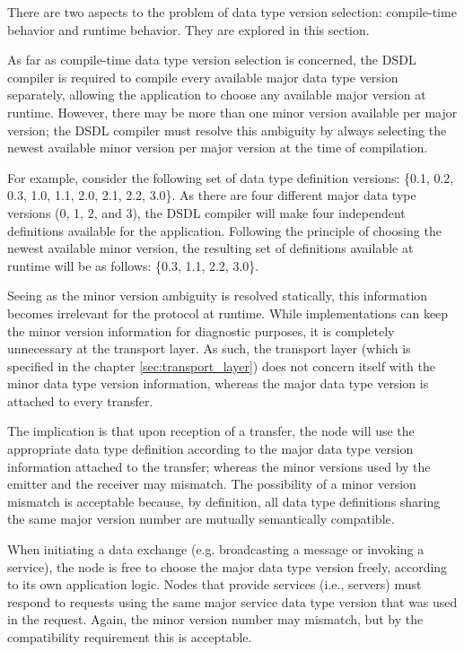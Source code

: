 There are two aspects to the problem of data type version selection:
compile-time behavior and runtime behavior.
They are explored in this section.

As far as compile-time data type version selection is concerned,
the DSDL compiler is required to compile every available major data type version separately,
allowing the application to choose any available major version at runtime.
However, there may be more than one minor version available per major version;
the DSDL compiler must resolve this ambiguity by always selecting the newest available minor
version per major version at the time of compilation.

For example, consider the following set of data type definition versions:
\{0.1, 0.2, 0.3, 1.0, 1.1, 2.0, 2.1, 2.2, 3.0\}.
As there are four different major data type versions (0, 1, 2, and 3),
the DSDL compiler will make four independent definitions available for the application.
Following the principle of choosing the newest available minor version,
the resulting set of definitions available at runtime will be as follows:
\{0.3, 1.1, 2.2, 3.0\}.

Seeing as the minor version ambiguity is resolved statically,
this information becomes irrelevant for the protocol at runtime.
While implementations can keep the minor version information for diagnostic purposes,
it is completely unnecessary at the transport layer.
As such, the transport layer (which is specified in the chapter \ref{sec:transport_layer})
does not concern itself with the minor data type version information,
whereas the major data type version is attached to every transfer.

The implication is that upon reception of a transfer, the node will use the appropriate
data type definition according to the major data type version information attached to the
transfer; whereas the minor versions used by the emitter and the receiver may mismatch.
The possibility of a minor version mismatch is acceptable because, by definition,
all data type definitions sharing the same major version number are mutually semantically compatible.

When initiating a data exchange (e.g. broadcasting a message or invoking a service),
the node is free to choose the major data type version freely, according to its own application logic.
Nodes that provide services (i.e., servers) must respond to requests using the same major service data type
version that was used in the request.
Again, the minor version number may mismatch, but by the compatibility requirement this is acceptable.

